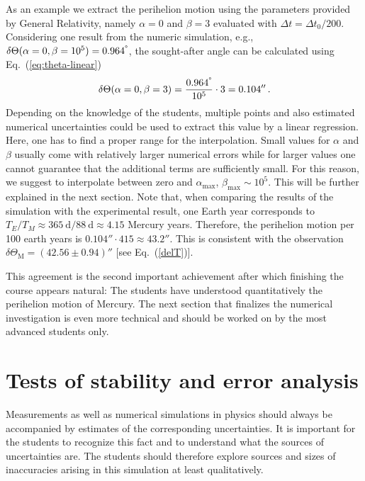 \documentclass[12pt,ngerman,american]{iopart}
\begin{document}
As an example we  extract the perihelion motion using the parameters provided by General Relativity, namely $\alpha = 0$ and $\beta = 3$ evaluated with $\Delta t = \Delta t_0 / 200$.
Considering one result from the numeric simulation, e.g., $\delta\Theta(\alpha = 0, \beta=10^5) = 0.964^{\degree}$, the sought-after angle can be calculated using Eq.~(\ref{eq:theta-linear})
\begin{equation}
	\delta\Theta (\alpha=0, \beta=3) = \frac{0.964^{\degree}}{10^5} \cdot 3 = 0.104''
	\, .
\end{equation}
Depending on the knowledge of the students, multiple points and also estimated numerical uncertainties could be used to extract this value by a linear regression.
Here, one has to find a proper range for the interpolation.
Small values for $\alpha$ and $\beta$ usually come with relatively larger numerical errors while for larger values one cannot guarantee that the additional terms are sufficiently small.
For this reason, we suggest to interpolate between zero and $\alpha_{\max}$, $\beta_{\max} \sim 10^5$.
This will be further explained in the next section.
Note that, when comparing the results of the simulation with the experimental result, one Earth year corresponds to $T_E/T_M \approx 365~\mathrm{d}/88~\mathrm{d}\approx 4.15$ Mercury years.
Therefore, the perihelion motion per 100 earth years is $0.104''\cdot 415\approx 43.2''$.
This is consistent with the observation $\delta\Theta_{\mathrm{M}} = (42.56\pm 0.94)''$ [see Eq.~(\ref{delT})].

This agreement is the second important achievement after which finishing the course appears natural: The students have understood quantitatively the
perihelion motion of Mercury. The next section that finalizes the numerical investigation is even more technical and should
be worked on by the most advanced students only.


\section{Tests of stability and error analysis}\label{sec:stability}
Measurements as well as numerical simulations in physics should always be accompanied by estimates of the corresponding uncertainties.
It is important for the students to recognize this fact and to understand what the sources of uncertainties are.
The students should therefore explore sources and sizes of inaccuracies arising in this simulation at least qualitatively.
\end{document}
